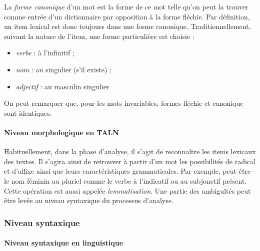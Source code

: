 La \emph{forme canonique} d'un mot est la forme de ce mot telle qu'on
peut la trouver comme entrée d'un dictionnaire par opposition à la
forme fléchie. Par définition, un item lexical est donc toujours dans
une forme canonique. Traditionnellement, suivant la nature de l'item,
une forme particulière est choisie :

\begin{itemize}
  
\item \emph{verbe} : à l'infinitif ;
\item \emph{nom} : au singulier (s'il existe) ;
\item \emph{adjectif} : au masculin singulier

\end{itemize}

On peut remarquer que, pour les mots invariables, formes fléchie et
canonique sont identiques.

\paragraph{Niveau morphologique en TALN}

Habituellement, dans la phase d'analyse, il s'agit de
reconnaître les items lexicaux des textes. Il s'agira ainsi de
retrouver à partir d'un mot les possibilités de radical et d'affixe
ainsi que leurs caractéristiques grammaticales. Par exemple,
 peut être le nom féminin  au pluriel
comme le verbe  à l'indicatif ou au subjonctif
présent. Cette opération est aussi appelée \emph{lemmatisation}. Une
partie des ambiguïtés peut être levée au niveau syntaxique du
processus d'analyse.

\subsubsection{Niveau syntaxique}\label{sec:niveau-syntaxique}

\paragraph{Niveau syntaxique en linguistique}

